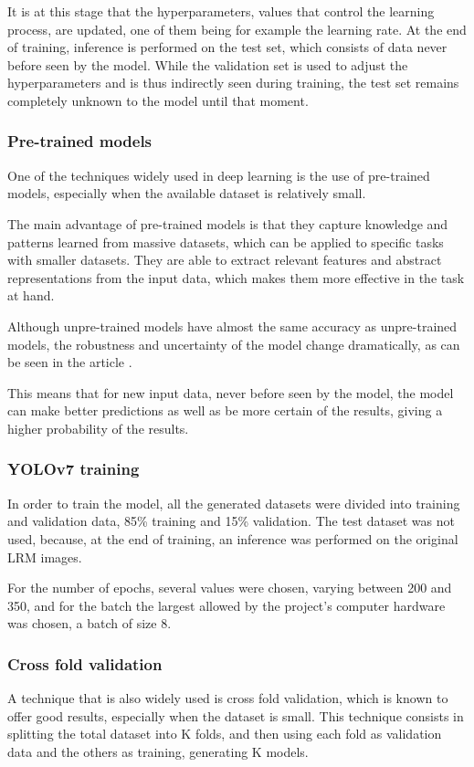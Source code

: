 It is at this stage that the hyperparameters, values that control the learning process, are updated, one of them being for example the learning rate.
At the end of training, inference is performed on the test set, which consists of data never before seen by the model. While the validation set is used to adjust the hyperparameters and is thus indirectly seen during training, the test set remains completely unknown to the model until that moment.

\subsubsection{Pre-trained models}
One of the techniques widely used in deep learning is the use of pre-trained models, especially when the available dataset is relatively small. 

The main advantage of pre-trained models is that they capture knowledge and patterns learned from massive datasets, which can be applied to specific tasks with smaller datasets. They are able to extract relevant features and abstract representations from the input data, which makes them more effective in the task at hand.

Although unpre-trained models have almost the same accuracy as unpre-trained models, the robustness and uncertainty of the model change dramatically, as can be seen in the article \cite{pretrainedmodels}.

This means that for new input data, never before seen by the model, the model can make better predictions as well as be more certain of the results, giving a higher probability of the results.



\subsubsection{YOLOv7 training}
In order to train the model, all the generated datasets were divided into training and validation data, 85\% training and 15\% validation. The test dataset was not used, because, at the end of training, an inference was performed on the original LRM images.

For the number of epochs, several values were chosen, varying between 200 and 350, and for the batch the largest allowed by the project's computer hardware was chosen, a batch of size 8.

\subsubsection{Cross fold validation}
A technique that is also widely used is cross fold validation, which is known to offer good results, especially when the dataset is small. This technique consists in splitting the total dataset into K folds, and then using each fold as validation data and the others as training, generating K models.

